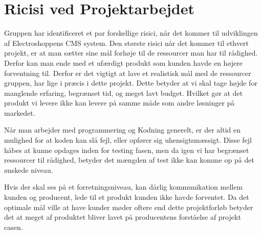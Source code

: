 \section{Ricisi ved Projektarbejdet}
Gruppen har identificeret et par forskellige risici, når det kommer til udviklingen af Electroshoppens CMS system. Den største risici når det kommer til ethvert projekt, er at man sætter sine mål forhøje til de ressourcer man har til rådighed. Derfor kan man ende med et ufærdigt produkt som kunden havde en højere forventning til. Derfor er det vigtigt at lave et realistisk mål med de ressourcer gruppen, har lige i præcis i dette projekt.  Dette betyder at vi skal tage højde for manglende erfaring, begrænset tid, og meget lavt budget. Hvilket gør at det produkt vi levere ikke kan levere på samme måde som andre løsninger på markedet. 

Når man arbejder med programmering og Kodning generelt, er der altid en mulighed for at koden kan slå fejl, eller opfører sig uhensigtsmæssigt. Disse fejl håbes at kunne opdages inden for testing fasen, men da igen vi har begrænset ressourcer til rådighed, betyder det mængden af test ikke kan komme op på det ønskede niveau.

Hvis der skal ses på et forretningsniveau, kan dårlig kommunikation mellem kunden og producent, lede til et produkt kunden ikke havde forventet. Da det optimale mål ville at have kunder møder oftere end dette projektforløb betyder det at meget af produktet bliver lavet på producentens forståelse af projekt casen. 

